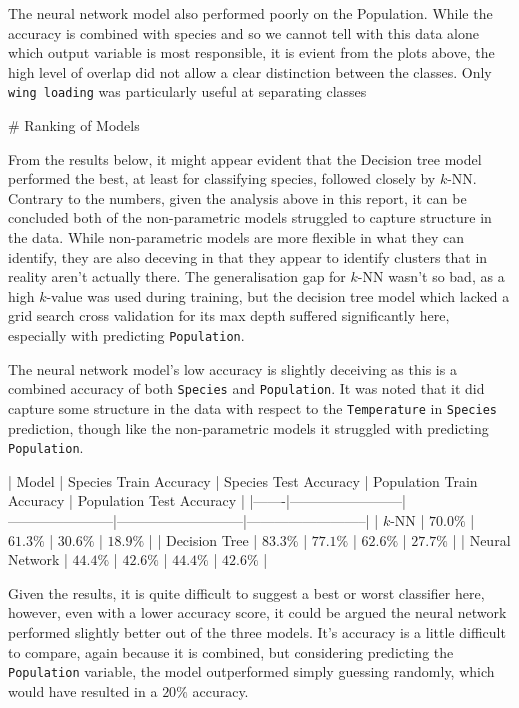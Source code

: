 \documentclass{article}
\begin{document}
The neural network model also performed poorly on the Population. While the accuracy is combined with species and so we cannot tell with this data alone which output variable is most responsible, it is evient from the plots above, the high level of overlap did not allow a clear distinction between the classes. Only \texttt{wing loading} was particularly useful at separating classes


# Ranking of Models

From the results below, it might appear evident that the Decision tree model performed the best, at least for classifying species, followed closely by $k$-NN. Contrary to the numbers, given the analysis above in this report, it can be concluded both of the non-parametric models struggled to capture structure in the data. While non-parametric models are more flexible in what they can identify, they are also deceving in that they appear to identify clusters that in reality aren't actually there. The generalisation gap for $k$-NN wasn't so bad, as a high $k$-value was used during training, but the decision tree model which lacked a grid search cross validation for its max depth suffered significantly here, especially with predicting \texttt{Population}. 

The neural network model's low accuracy is slightly deceiving as this is a combined accuracy of both \texttt{Species} and \texttt{Population}. It was noted that it did capture some structure in the data with respect to the \texttt{Temperature} in \texttt{Species} prediction, though like the non-parametric models it struggled with predicting \texttt{Population}. 

| Model | Species Train Accuracy | Species Test Accuracy | Population Train Accuracy | Population Test Accuracy |
|-------|------------------------|-----------------------|---------------------------|--------------------------|
| $k$-NN            |  $70.0\%$  |       $61.3\%$        |           $30.6\%$        |         $18.9\%$         |
| Decision Tree     |  $83.3\%$  |       $77.1\%$        |           $62.6\%$        |         $27.7\%$         |
| Neural Network    |  $44.4\%$  |       $42.6\%$        |           $44.4\%$        |         $42.6\%$         |


Given the results, it is quite difficult to suggest a best or worst classifier here, however, even with a lower accuracy score, it could be argued the neural network performed slightly better out of the three models. It's accuracy is a little difficult to compare, again because it is combined, but considering predicting the \texttt{Population} variable, the model outperformed simply guessing randomly, which would have resulted in a $20\%$ accuracy.
\end{document}
